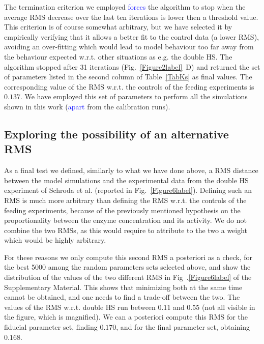 \documentclass[oneside, 10pt, a4paper, twocolumn]{article}
\begin{document}
The termination criterion we employed \textcolor{blue}{forces} the algorithm to stop when the average RMS decrease over the last ten iterations is lower then a threshold value. This criterion is of course somewhat arbitrary, but we have selected it by empirically verifying that it allows a better fit to the control data (a lower RMS), avoiding an over-fitting which would lead to model behaviour too far away from the behaviour expected w.r.t. other situations as e.g. the double HS. %
The algorithm stopped after 31 iterations (Fig.~\ref{Figure2label}~D) and returned the set of parameters listed in the second column of Table~\ref{TabKs} as final values. The corresponding value of the RMS w.r.t. the controls of the feeding experiments is $0.137$.  We have employed this set of parameters to perform all the simulations shown in this work (\textcolor{blue}{apart} from the calibration runs).




\subsection{Exploring the possibility of an alternative RMS}

As a final test we defined, similarly to what we have done above, a RMS distance between the model simulations and the experimental data from the double HS experiment of Schroda et al. \cite{Schroda2000} (reported in Fig.~\ref{Figure6label}). 
Defining such an RMS is much more arbitrary than defining the RMS w.r.t. the controls of the feeding experiments, because of the previously mentioned hypothesis on the proportionality between the enzyme concentration and its activity. %
We do not combine the two RMSs, as this would require to attribute to the two a weight which would be highly arbitrary. 

For these reasons we only compute this second RMS a posteriori as a check, for the best 5000 among the random parameters sets selected above, and show the distribution of the values of the two different RMS in Fig~.\ref{Figure6label} of the Supplementary Material. This shows that minimizing both at the same time cannot be obtained, and one needs to find a trade-off between the two. The values of the RMS w.r.t. double HS run between $0.11$ and $0.55$ (not all visible in the figure, which is magnified). We can a posteriori compute this RMS for the fiducial parameter set, finding $0.170$, and for the final parameter set, obtaining $0.168$.
\end{document}
